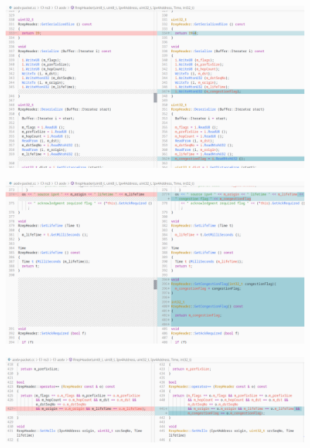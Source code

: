 \documentclass[12pt, a4paper]{article}
\begin{document}
\begin{figure}[H]
\centering
\includegraphics[scale = 0.4]{images/cc-aodv/rrep-05.png}

\end{figure}
\begin{figure}[H]
\centering
\includegraphics[scale = 0.4]{images/cc-aodv/rrep-06.png}

\end{figure}
\begin{figure}[H]
\centering
\includegraphics[scale = 0.4]{images/cc-aodv/rrep-07.png}
\end{figure}
\end{document}
